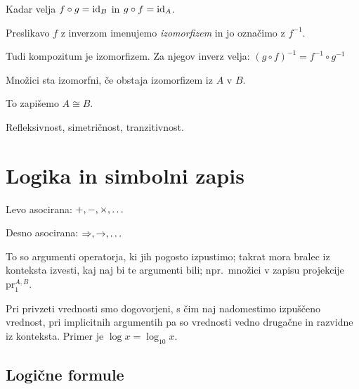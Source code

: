 
Kadar velja $f \circ g = \mathrm{id}_B$ in $g \circ f = \mathrm{id}_A$.

Preslikavo $f$ z inverzom imenujemo \textit{izomorfizem} in jo označimo z $f^{-1}$.


Tudi kompozitum je izomorfizem. Za njegov inverz velja:
$(g \circ f)^{-1} = f^{-1} \circ g^{-1}$


Množici sta izomorfni, če obstaja izomorfizem iz $A$ v $B$.

To zapišemo $A \cong B$.


Refleksivnost, simetričnost, tranzitivnost.

\section{Logika in simbolni zapis}


Levo asocirana: $+, -, \times, \ldots$

Desno asocirana: $\Rightarrow, \to, \ldots$


To so argumenti operatorja, ki jih pogosto izpustimo; takrat mora bralec iz konteksta izvesti, kaj naj bi te argumenti bili; npr.\ množici v zapisu projekcije $\text{pr}_1^{A,B}$.


Pri privzeti vrednosti smo dogovorjeni, s čim naj nadomestimo izpuščeno vrednost, pri implicitnih argumentih pa so vrednosti vedno drugačne in razvidne iz konteksta. Primer je $\log x = \log_{10} x$.

\subsection{Logične formule}


